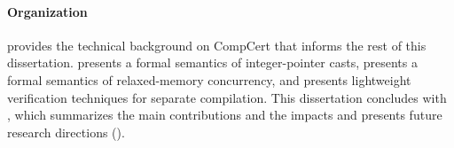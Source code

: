 \paragraph{Organization}

 provides the technical background on CompCert that informs the rest of this
dissertation.   presents a formal semantics of integer-pointer casts,
 presents a formal semantics of relaxed-memory concurrency, and
 presents lightweight verification techniques for separate compilation.  This
dissertation concludes with , which summarizes the main contributions and the
impacts and presents future research directions ().


